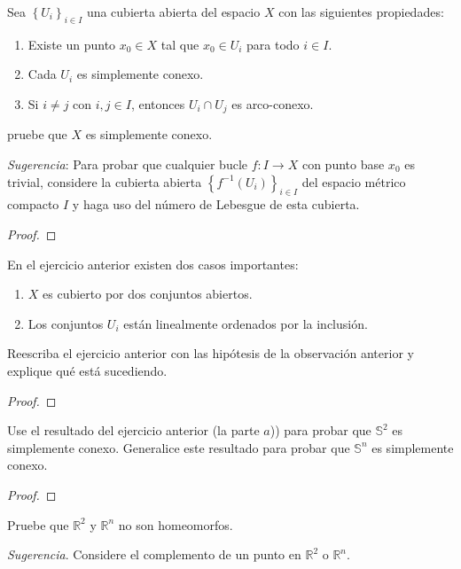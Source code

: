 \documentclass[12pt]{report}
\theoremstyle{largebreak}
\newcommand\cf[3]{\ensuremath{#1:#2\rightarrow#3}}
\begin{document}
    \begin{excer}
        Sea $\left\{U_i \right\}_{ i\in I}$ una cubierta abierta del espacio $X$ con las siguientes propiedades:
        \renewcommand{\theenumi}{\alph{enumi}}
        \begin{enumerate}
            \item Existe un punto $x_0\in X$ tal que $x_0\in U_i$ para todo $i\in I$.
            \item Cada $U_i$ es simplemente conexo.
            \item Si $i\neq j$ con $i,j\in I$, entonces $U_i\cap U_j$ es arco-conexo. 
        \end{enumerate}
        pruebe que $X$ es simplemente conexo.
        
        \textit{Sugerencia}: Para probar que cualquier bucle $\cf{f}{I}{X}$ con punto base $x_0$ es trivial, considere la cubierta abierta $\left\{f^{-1}(U_i) \right\}_{ i\in I}$ del espacio métrico compacto $I$ y haga uso del número de Lebesgue de esta cubierta.
    \end{excer}

    \begin{proof}
        
    \end{proof}

    \begin{obs}
        En el ejercicio anterior existen dos casos importantes:
        \begin{enumerate}
            \item $X$ es cubierto por dos conjuntos abiertos.
            \item Los conjuntos $U_i$ están linealmente ordenados por la inclusión.
        \end{enumerate}
    \end{obs}

    \begin{excer}
        Reescriba el ejercicio anterior con las hipótesis de la observación anterior y explique qué está sucediendo.
    \end{excer}

    \begin{proof}
        
    \end{proof}

    \begin{excer}
        Use el resultado del ejercicio anterior (la parte $a$)) para probar que $\mathbb{S}^2$ es simplemente conexo. Generalice este resultado para probar que $\mathbb{S}^n$ es simplemente conexo.
    \end{excer}

    \begin{proof}
        
    \end{proof}

    \begin{excer}
        Pruebe que $\mathbb{R}^2$ y $\mathbb{R}^n$ no son homeomorfos.

        \textit{Sugerencia}. Considere el complemento de un punto en $\mathbb{R}^2$ o $\mathbb{R}^n$.
    \end{excer}
\end{document}
